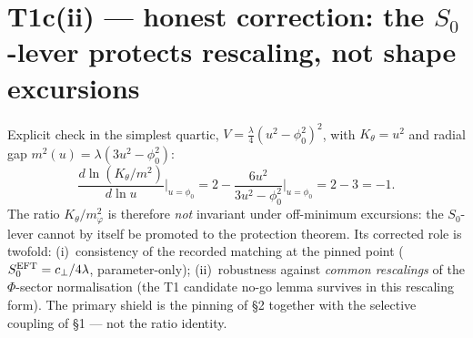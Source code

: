 \documentclass[11pt,a4paper]{article}
\begin{document}
\section{T1c(ii) --- honest correction: the $S_0$-lever protects rescaling, not
shape excursions}
Explicit check in the simplest quartic, $V=\tfrac{\lambda}{4}(u^2-\phi_0^2)^2$,
with $K_\theta=u^2$ and radial gap $m^2(u)=\lambda(3u^2-\phi_0^2)$:
\[
\frac{d\ln(K_\theta/m^2)}{d\ln u}\Big|_{u=\phi_0}
=2-\frac{6u^2}{3u^2-\phi_0^2}\Big|_{u=\phi_0}=2-3=-1 .
\]
The ratio $K_\theta/m_\varphi^2$ is therefore \emph{not} invariant under
off-minimum excursions: the $S_0$-lever cannot by itself be promoted to the
protection theorem. Its corrected role is twofold: (i)~consistency of the
recorded matching at the pinned point ($S_0^{\rm EFT}=c_\perp/4\lambda$,
parameter-only); (ii)~robustness against \emph{common rescalings} of the
$\Phi$-sector normalisation (the T1 candidate no-go lemma survives in this
rescaling form). The primary shield is the pinning of \S2 together with the
selective coupling of \S1 --- not the ratio identity.
\end{document}
